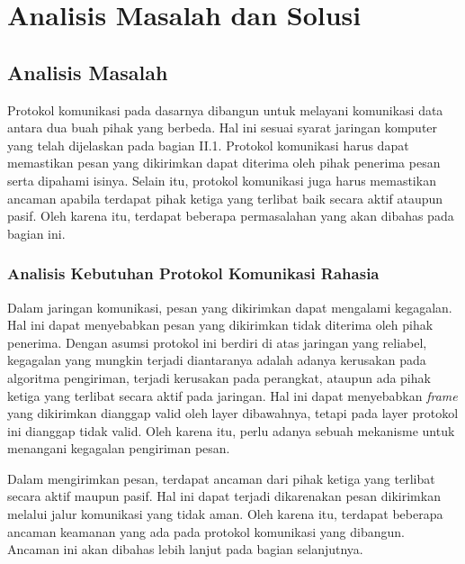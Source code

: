

\chapter{Analisis Masalah dan Solusi}

\section{Analisis Masalah}

Protokol komunikasi pada dasarnya dibangun untuk melayani komunikasi data antara dua buah pihak yang berbeda. Hal ini sesuai syarat jaringan komputer yang telah dijelaskan pada bagian II.1. Protokol komunikasi harus dapat memastikan pesan yang dikirimkan dapat diterima oleh pihak penerima pesan serta dipahami isinya. Selain itu, protokol komunikasi juga harus memastikan ancaman apabila terdapat pihak ketiga yang terlibat baik secara aktif ataupun pasif. Oleh karena itu, terdapat beberapa permasalahan yang akan dibahas pada bagian ini.

\subsection{Analisis Kebutuhan Protokol Komunikasi Rahasia}

Dalam jaringan komunikasi, pesan yang dikirimkan dapat mengalami kegagalan. Hal ini dapat menyebabkan pesan yang dikirimkan tidak diterima oleh pihak penerima. Dengan asumsi protokol ini berdiri di atas jaringan yang reliabel, kegagalan yang mungkin terjadi diantaranya adalah adanya kerusakan pada algoritma pengiriman, terjadi kerusakan pada perangkat, ataupun ada pihak ketiga yang terlibat secara aktif pada jaringan. Hal ini dapat menyebabkan \emph{frame} yang dikirimkan dianggap valid oleh layer dibawahnya, tetapi pada layer protokol ini dianggap tidak valid. Oleh karena itu, perlu adanya sebuah mekanisme untuk menangani kegagalan pengiriman pesan.

Dalam mengirimkan pesan, terdapat ancaman dari pihak ketiga yang terlibat secara aktif maupun pasif. Hal ini dapat terjadi dikarenakan pesan dikirimkan melalui jalur komunikasi yang tidak aman. Oleh karena itu, terdapat beberapa ancaman keamanan yang ada pada protokol komunikasi yang dibangun. Ancaman ini akan dibahas lebih lanjut pada bagian selanjutnya.

